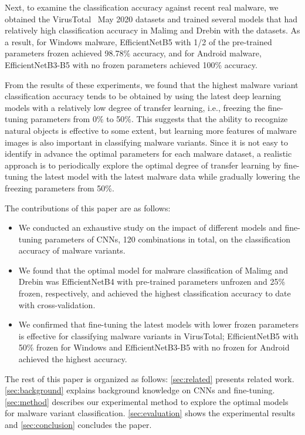 \documentclass[conference]{IEEEtran}
\begin{document}
Next, to examine the classification accuracy against recent real malware, we obtained the VirusTotal~\cite{VirusTotal} May 2020 datasets and trained several models that had relatively high classification accuracy in Malimg and Drebin with the datasets.
As a result, for Windows malware, EfficientNetB5 with 1/2 of the pre-trained parameters frozen achieved 98.78\% accuracy, and for Android malware, EfficientNetB3-B5 with no frozen parameters achieved 100\% accuracy. 

From the results of these experiments, we found that the highest malware variant classification accuracy tends to be obtained by using the latest deep learning models with a relatively low degree of transfer learning, i.e., freezing the fine-tuning parameters from 0\% to 50\%.
This suggests that the ability to recognize natural objects is effective to some extent, but learning more features of malware images is also important in classifying malware variants.
Since it is not easy to identify in advance the optimal parameters for each malware dataset, a realistic approach is to periodically explore the optimal degree of transfer learning by fine-tuning the latest model with the latest malware data while gradually lowering the freezing parameters from 50\%.

The contributions of this paper are as follows:
\begin{itemize}
\item We conducted an exhaustive study on the impact of different models and fine-tuning parameters of CNNs, 120 combinations in total, on the classification accuracy of malware variants.
\item We found that the optimal model for malware classification of Malimg and Drebin was EfficientNetB4 with pre-trained parameters unfrozen and 25\% frozen, respectively, and achieved the highest classification accuracy to date with cross-validation.
\item We confirmed that fine-tuning the latest models with lower frozen parameters is effective for classifying malware variants in VirusTotal; EfficientNetB5 with 50\% frozen for Windows and EfficientNetB3-B5 with no frozen for Android achieved the highest accuracy.
\end{itemize}

The rest of this paper is organized as follows:
\autoref{sec:related} presents related work.
\autoref{sec:background} explains background knowledge on CNNs and fine-tuning.
\autoref{sec:method} describes our experimental method to explore the optimal models for malware variant classification.
\autoref{sec:evaluation} shows the experimental results and
\autoref{sec:conclusion} concludes the paper.
\end{document}
